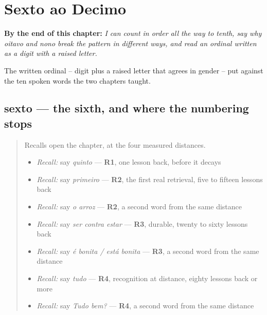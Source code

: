 
\chapter{Sexto ao Decimo}
\label{ch:pt-ordinais-ate-decimo}

\begin{chapteropening}
\textbf{By the end of this chapter:} \emph{I can count in order all the way to tenth, say why oitavo and nono break the pattern in different ways, and read an ordinal written as a digit with a raised letter.}

The written ordinal -- digit plus a raised letter that agrees in gender -- put against the ten spoken words the two chapters taught.
\end{chapteropening}

\section[sexto / sexta]{sexto — the sixth, and where the numbering stops}

\label{lesson:PT-C28-sexto}



\begin{quote}
Recalls open the chapter, at the four measured distances.

\begin{itemize}
\raggedright
  \item \emph{Recall:} say \emph{quinto} — \textbf{R1}, one lesson back, before it decays
  \item \emph{Recall:} say \emph{primeiro} — \textbf{R2}, the first real retrieval, five to fifteen lessons back
  \item \emph{Recall:} say \emph{o arroz} — \textbf{R2}, a second word from the same distance
  \item \emph{Recall:} say \emph{ser contra estar} — \textbf{R3}, durable, twenty to sixty lessons back
  \item \emph{Recall:} say \emph{é bonita / está bonita} — \textbf{R3}, a second word from the same distance
  \item \emph{Recall:} say \emph{tudo} — \textbf{R4}, recognition at distance, eighty lessons back or more
  \item \emph{Recall:} say \emph{Tudo bem?} — \textbf{R4}, a second word from the same distance
\end{itemize}
\end{quote}


